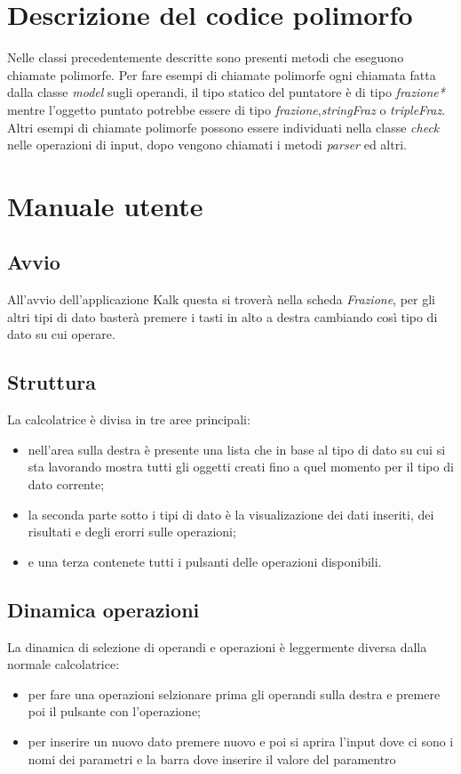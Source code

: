 \documentclass[a4paper,10pt]{article}
\begin{document}
        \section{Descrizione del codice polimorfo}
        Nelle classi precedentemente descritte sono presenti metodi che eseguono chiamate polimorfe.
        Per fare esempi di chiamate polimorfe ogni chiamata fatta dalla classe \textit{model} sugli operandi, il tipo statico del puntatore è di tipo \textit{frazione*} mentre l'oggetto puntato potrebbe essere di tipo \textit{frazione},\textit{stringFraz} o \textit{tripleFraz}.
        Altri esempi di chiamate polimorfe possono essere individuati nella classe \textit{check} nelle operazioni di input, dopo vengono chiamati i metodi \textit{parser} ed altri.

        \section{Manuale utente}
        \subsection{Avvio}
        All’avvio dell’applicazione Kalk questa si troverà nella scheda \textit{Frazione}, per gli altri tipi di dato basterà premere i tasti in alto a destra cambiando così tipo di dato su cui operare.
        \subsection{Struttura}
        La calcolatrice è divisa in tre aree principali:
        \begin{itemize}
            \item nell’area sulla destra è presente una lista che in base al tipo di dato su cui si sta lavorando mostra tutti gli oggetti creati fino a quel momento per il tipo di dato corrente;
            \item la seconda parte sotto i tipi di dato è la visualizazione dei dati inseriti, dei risultati e degli erorri sulle operazioni;
            \item e una terza contenete tutti i pulsanti delle operazioni disponibili.
        \end{itemize}  
        \subsection{Dinamica operazioni}
        La dinamica di selezione di operandi e operazioni è leggermente diversa dalla normale calcolatrice:
        \begin{itemize}
            \item per fare una operazioni selzionare prima gli operandi sulla destra e premere poi il pulsante con l'operazione;
            \item per inserire un nuovo dato premere nuovo e poi si aprira l'input dove ci sono i nomi dei parametri e la barra dove inserire il valore del paramentro
        \end{itemize}
\end{document}
